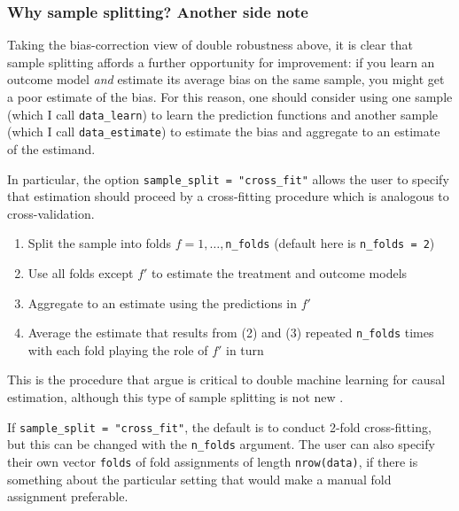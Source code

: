 \documentclass[
]{article}
\providecommand{\tightlist}{%
  \setlength{\itemsep}{0pt}\setlength{\parskip}{0pt}}
\begin{document}
\hypertarget{why-sample-splitting-another-side-note}{%
\subsubsection{Why sample splitting? Another side note}\label{why-sample-splitting-another-side-note}}

Taking the bias-correction view of double robustness above, it is clear that sample splitting affords a further opportunity for improvement: if you learn an outcome model \emph{and} estimate its average bias on the same sample, you might get a poor estimate of the bias. For this reason, one should consider using one sample (which I call \texttt{data\_learn}) to learn the prediction functions and another sample (which I call \texttt{data\_estimate}) to estimate the bias and aggregate to an estimate of the estimand.

In particular, the option \texttt{sample\_split\ =\ "cross\_fit"} allows the user to specify that estimation should proceed by a cross-fitting procedure which is analogous to cross-validation.

\begin{enumerate}
\def\labelenumi{\arabic{enumi}.}
\tightlist
\item
  Split the sample into folds \(f = 1,\dots,\)\texttt{n\_folds} (default here is \texttt{n\_folds\ =\ 2})\\
\item
  Use all folds except \(f'\) to estimate the treatment and outcome models\\
\item
  Aggregate to an estimate using the predictions in \(f'\)\\
\item
  Average the estimate that results from (2) and (3) repeated \texttt{n\_folds} times with each fold playing the role of \(f'\) in turn
\end{enumerate}

This is the procedure that \citet{chernozhukov2018} argue is critical to double machine learning for causal estimation, although this type of sample splitting is not new \citep{bickel1982}.

If \texttt{sample\_split\ =\ "cross\_fit"}, the default is to conduct 2-fold cross-fitting, but this can be changed with the \texttt{n\_folds} argument. The user can also specify their own vector \texttt{folds} of fold assignments of length \texttt{nrow(data)}, if there is something about the particular setting that would make a manual fold assignment preferable.
\end{document}

